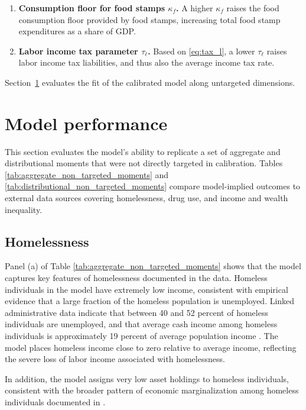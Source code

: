 \documentclass[parskip=full]{article}
\theoremstyle{plain}
\theoremstyle{definition}
\theoremstyle{remark}
\begin{document}
\begin{enumerate}
\item \textbf{Consumption floor for food stamps $\kappa_f$.} A higher $\kappa_f$ raises the food consumption floor provided by food stamps, increasing total food stamp expenditures as a share of GDP.

\item \textbf{Labor income tax parameter $\tau_{\ell}$.} Based on \eqref{eq:tax_l}, a lower $\tau_{\ell}$ raises labor income tax liabilities, and thus also the average income tax rate.

\end{enumerate} 

Section~\ref{sec:model_performance} evaluates the fit of the calibrated model along untargeted dimensions.

\section{Model performance}\label{sec:model_performance}

This section evaluates the model’s ability to replicate a set of aggregate and distributional moments that were not directly targeted in calibration. Tables \ref{tab:aggregate_non_targeted_moments} and \ref{tab:distributional_non_targeted_moments} compare model-implied outcomes to external data sources covering homelessness, drug use, and income and wealth inequality.

\subsection{Homelessness}

Panel (a) of Table \ref{tab:aggregate_non_targeted_moments} shows that the model captures key features of homelessness documented in the data. Homeless individuals in the model have extremely low income, consistent with empirical evidence that a large fraction of the homeless population is unemployed. Linked administrative data indicate that between 40 and 52 percent of homeless individuals are unemployed, and that average cash income among homeless individuals is approximately 19 percent of average population income \citep{meyer_wyse_logani_2024_mortality}. The model places homeless income close to zero relative to average income, reflecting the severe loss of labor income associated with homelessness.

In addition, the model assigns very low asset holdings to homeless individuals, consistent with the broader pattern of economic marginalization among homeless individuals documented in \citet{meyer_wyse_logani_2024_mortality}.
\end{document}

